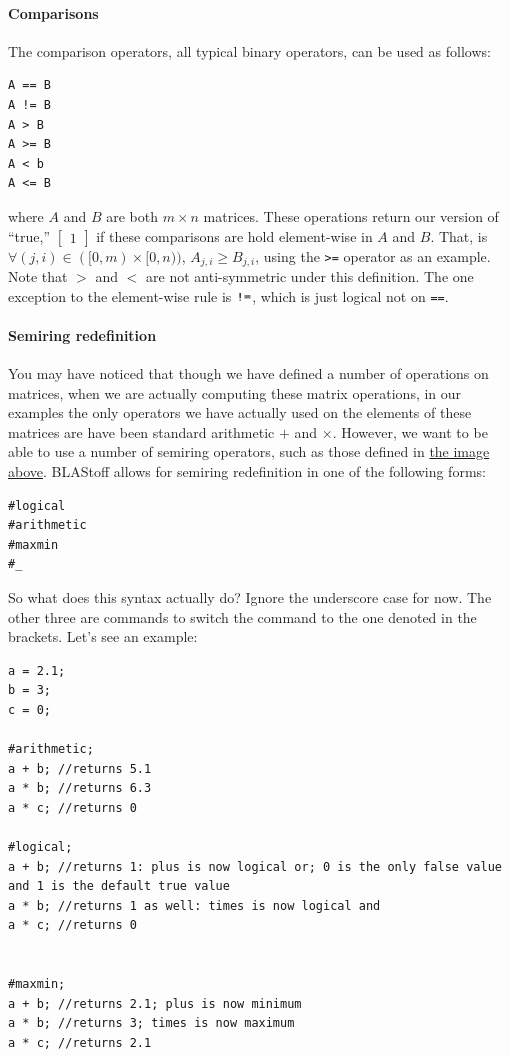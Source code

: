 \paragraph{Comparisons}

The comparison operators, all typical binary operators,  can be used as follows:\begin{lstlisting}
A == B
A != B
A > B
A >= B
A < b
A <= B
\end{lstlisting}
where $A$ and $B$ are both $m\times n$ matrices.  These operations return our version of ``true,'' $\begin{bmatrix}1\end{bmatrix}$ if these comparisons are hold element-wise in $A$ and $B$.  That, is $\forall (j,i) \in ([0,m) \times [0, n))$, $A_{j,i} \geq B_{j,i}$, using the \verb|>=| operator as an example.  Note that $>$ and $<$ are not anti-symmetric under this definition.
The one exception to the element-wise rule is $\verb|!=|$, which is just logical not on \verb|==|.

\paragraph{Semiring redefinition}
You may have noticed that though we have defined a number of operations on matrices, when we are actually computing these matrix operations, in our examples the only operators we have actually used on the elements of these matrices are have been standard arithmetic $+$ and $\times$.  However, we want to be able to use a number of semiring operators, such as those defined in \hyperref[sec:semirings]{the image above}.  BLAStoff allows for semiring redefinition in one of the following forms:
\begin{lstlisting}
#logical
#arithmetic
#maxmin
#_
\end{lstlisting}
So what does this syntax actually do?  Ignore the underscore case for now.  The other three are commands to switch the command to the one denoted in the brackets.  Let's see an example:

\begin{lstlisting}
a = 2.1;
b = 3;
c = 0;

#arithmetic;
a + b; //returns 5.1
a * b; //returns 6.3
a * c; //returns 0

#logical;
a + b; //returns 1: plus is now logical or; 0 is the only false value and 1 is the default true value
a * b; //returns 1 as well: times is now logical and
a * c; //returns 0


#maxmin;
a + b; //returns 2.1; plus is now minimum
a * b; //returns 3; times is now maximum
a * c; //returns 2.1
\end{lstlisting}


